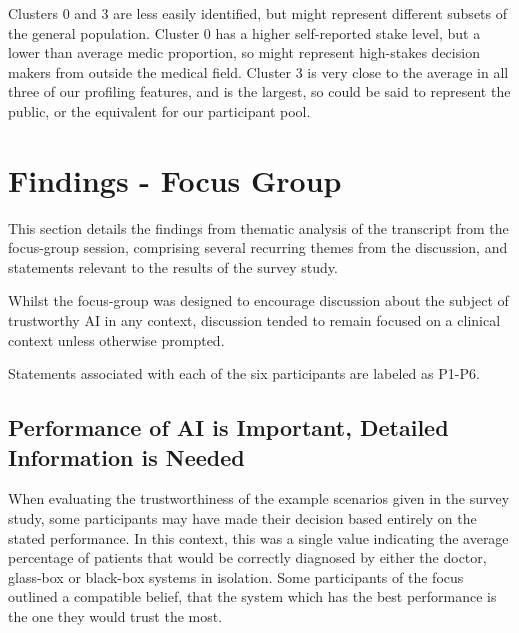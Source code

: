 \documentclass[manuscript,screen,review]{acmart}
\begin{document}
Clusters 0 and 3 are less easily identified, but might represent different subsets of the general population. Cluster 0 has a higher self-reported stake level, but a lower than average medic proportion, so might represent high-stakes decision makers from outside the medical field. Cluster 3 is very close to the average in all three of our profiling features, and is the largest, so could be said to represent the public, or the equivalent for our participant pool.


\newpage
\section{Findings - Focus Group}

This section details the findings from thematic analysis of the transcript from the focus-group session, comprising several recurring themes from the discussion, and statements relevant to the results of the survey study. 


Whilst the focus-group was designed to encourage discussion about the subject of trustworthy AI in any context, discussion tended to remain focused on a clinical context unless otherwise prompted.

Statements associated with each of the six participants are labeled as P1-P6. 


\subsection{Performance of AI is Important, Detailed Information is Needed}
When evaluating the trustworthiness of the example scenarios given in the survey study, some participants may have made their decision based entirely on the stated performance. In this context, this was a single value indicating the average percentage of patients that would be correctly diagnosed by either the doctor, glass-box or black-box systems in isolation. Some participants of the focus outlined a compatible belief, that the system which has the best performance is the one they would trust the most. 
\end{document}
